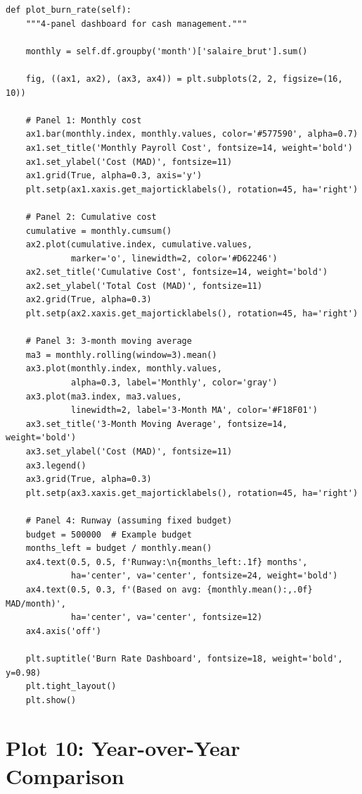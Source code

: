 \begin{lstlisting}[style=pythonstyle]
def plot_burn_rate(self):
    """4-panel dashboard for cash management."""
    
    monthly = self.df.groupby('month')['salaire_brut'].sum()
    
    fig, ((ax1, ax2), (ax3, ax4)) = plt.subplots(2, 2, figsize=(16, 10))
    
    # Panel 1: Monthly cost
    ax1.bar(monthly.index, monthly.values, color='#577590', alpha=0.7)
    ax1.set_title('Monthly Payroll Cost', fontsize=14, weight='bold')
    ax1.set_ylabel('Cost (MAD)', fontsize=11)
    ax1.grid(True, alpha=0.3, axis='y')
    plt.setp(ax1.xaxis.get_majorticklabels(), rotation=45, ha='right')
    
    # Panel 2: Cumulative cost
    cumulative = monthly.cumsum()
    ax2.plot(cumulative.index, cumulative.values,
             marker='o', linewidth=2, color='#D62246')
    ax2.set_title('Cumulative Cost', fontsize=14, weight='bold')
    ax2.set_ylabel('Total Cost (MAD)', fontsize=11)
    ax2.grid(True, alpha=0.3)
    plt.setp(ax2.xaxis.get_majorticklabels(), rotation=45, ha='right')
    
    # Panel 3: 3-month moving average
    ma3 = monthly.rolling(window=3).mean()
    ax3.plot(monthly.index, monthly.values,
             alpha=0.3, label='Monthly', color='gray')
    ax3.plot(ma3.index, ma3.values,
             linewidth=2, label='3-Month MA', color='#F18F01')
    ax3.set_title('3-Month Moving Average', fontsize=14, weight='bold')
    ax3.set_ylabel('Cost (MAD)', fontsize=11)
    ax3.legend()
    ax3.grid(True, alpha=0.3)
    plt.setp(ax3.xaxis.get_majorticklabels(), rotation=45, ha='right')
    
    # Panel 4: Runway (assuming fixed budget)
    budget = 500000  # Example budget
    months_left = budget / monthly.mean()
    ax4.text(0.5, 0.5, f'Runway:\n{months_left:.1f} months',
             ha='center', va='center', fontsize=24, weight='bold')
    ax4.text(0.5, 0.3, f'(Based on avg: {monthly.mean():,.0f} MAD/month)',
             ha='center', va='center', fontsize=12)
    ax4.axis('off')
    
    plt.suptitle('Burn Rate Dashboard', fontsize=18, weight='bold', y=0.98)
    plt.tight_layout()
    plt.show()
\end{lstlisting}

\section{Plot 10: Year-over-Year Comparison}

